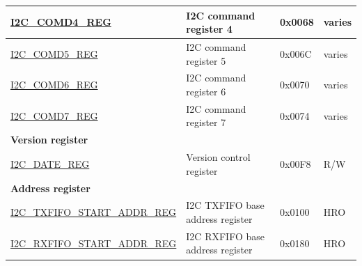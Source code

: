 \begin{longtable}{ | p{6cm} | p{7cm} | p{1.3cm} | p{1cm} | }
\hyperref[regdesc:I2CCOMD4REG]{I2C\_COMD4\_REG} & I2C command register 4 & 0x0068 & varies \\ \hline
\hyperref[regdesc:I2CCOMD5REG]{I2C\_COMD5\_REG} & I2C command register 5 & 0x006C & varies \\ \hline
\hyperref[regdesc:I2CCOMD6REG]{I2C\_COMD6\_REG} & I2C command register 6 & 0x0070 & varies \\ \hline
\hyperref[regdesc:I2CCOMD7REG]{I2C\_COMD7\_REG} & I2C command register 7 & 0x0074 & varies \\ \hline
\multicolumn{4}{|l|}{\textbf{Version register}} \\ \hline
\hyperref[regdesc:I2CDATEREG]{I2C\_DATE\_REG} & Version control register & 0x00F8 & R/W \\ \hline
\multicolumn{4}{|l|}{\textbf{Address register}} \\ \hline
\hyperref[regdesc:I2CTXFIFOSTARTADDRREG]{I2C\_TXFIFO\_START\_ADDR\_REG} & I2C TXFIFO base address register & 0x0100 & HRO \\ \hline
\hyperref[regdesc:I2CRXFIFOSTARTADDRREG]{I2C\_RXFIFO\_START\_ADDR\_REG} & I2C RXFIFO base address register & 0x0180 & HRO \\ \hline
\end{longtable}
